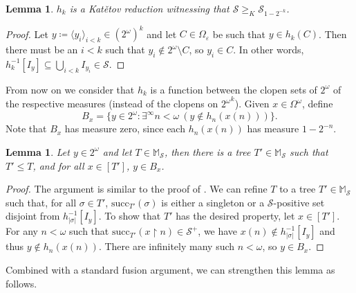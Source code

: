 \documentclass[a4paper,12pt]{amsart}
\newtheorem{lem}[thm]{Lemma}
\theoremstyle{definition}
\numberwithin{thm}{section}
\numberwithin{equation}{section}
\renewcommand{\subset}{\subseteq}
\newcommand{\cantor}{2^{\omega}}
\newcommand{\Solecki}{\mathcal{S}}
\begin{document}
    \begin{lem}
        $h_k$ is a Kat\v{e}tov reduction witnessing that $\Solecki \geq_K \Solecki_{1 - 2^{-k}}$.
    \end{lem}
    \begin{proof}
        Let $ y \coloneqq \langle y_i \rangle_{i < k} \in (2^\omega)^k$ and let $C\in\Omega_\varepsilon$ be such that $y \in h_k(C)$. Then there must be an $i < k$ such that $y_i \notin \cantor \setminus C$, so $y_i \in C$. In other words, $h_k^{-1}[I_{y}]\subset\bigcup_{i<k}I_{y_i}\in\Solecki$.
    \end{proof}

     From now on we consider that $h_k$ is a function between the clopen sets of $\cantor$ of the respective measures (instead of the clopens on ${\cantor}^k$). Given $x \in \Omega^\omega$, define
     \[
     B_x = \{ y \in \cantor : \exists ^\infty n < \omega~( y \notin h_n (x(n))) \}.
     \]
     Note that $B_x$ has measure zero, since each $h_n(x(n))$ has measure $1 - 2^{-n}$.

    \begin{lem}\label{lem:Soloecki_B_x}
        Let $y \in \cantor$ and let $T \in \mathbb{M}_\Solecki$, then there is a tree $T' \in \mathbb{M}_\Solecki$ such that $T' \leq T$, and for all $x \in [T']$, $y \in B_x$.
    \end{lem}
    \begin{proof}
        The argument is similar to the proof of . We can refine $T$ to a tree $T'\in\mathbb{M}_\Solecki$ such that, for all $\sigma \in T'$, $\mathrm{succ}_{T'}(\sigma)$ is either a singleton or a $\Solecki$-positive set disjoint from $h_{\lvert\sigma\rvert}^{-1}[I_y]$. To show that $T'$ has the desired property, let $x \in [T']$. For any $n<\omega$ such that $\mathrm{succ}_{T'}(x\upharpoonright n)\in\Solecki^+$, we have $x(n)\notin h_{\lvert\sigma\rvert}^{-1}[I_y]$ and thus $y\notin h_n(x(n))$. There are infinitely many such $n<\omega$, so $y\in B_x$.
    \end{proof}
    
    Combined with a standard fusion argument, we can strengthen this lemma as follows.
\end{document}
